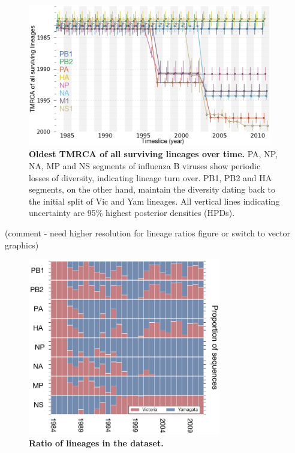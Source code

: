 \documentclass[11pt,oneside,letterpaper]{article}
\begin{document}
\begin{figure}[h]
	\centering		
	\includegraphics[width=0.95\textwidth]{figures/InfB_tmrcaOT_lines.png}
	\caption{\textbf{Oldest TMRCA of all surviving lineages over time.}
PA, NP, NA, MP and NS segments of influenza B viruses show periodic losses of diversity, indicating lineage turn over.
PB1, PB2 and HA segments, on the other hand, maintain the diversity dating back to the initial split of Vic and Yam lineages.
All vertical lines indicating uncertainty are 95\% highest posterior densities (HPDs).}
	\label{tmrcaOT}
\end{figure}

(comment - need higher resolution for lineage ratios figure or switch to vector graphics)
\begin{figure}[h]
	\centering	
	\includegraphics[width=0.75\textwidth]	{figures/InfB_LineageRatiosOverTime.png}
	\caption{\textbf{Ratio of lineages in the dataset.}}
	\label{lineageRatiosOverTime}
\end{figure}
\end{document}
